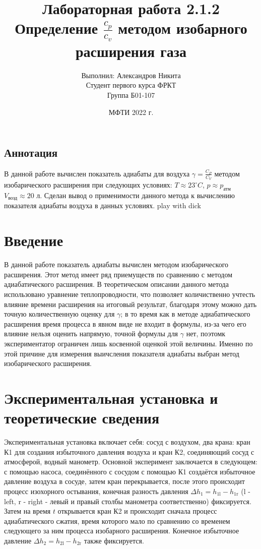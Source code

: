 \documentclass[a4paper,14pt]{article}
\title{Лабораторная работа 2.1.2\\Определение $\frac{c_p}{c_v}$ методом
изобарного расширения газа}
\author{Выполнил: Александров Никита\\ Студент первого курса ФРКТ\\Группа Б01-107}
\date{МФТИ 2022 г.}
\begin{document}
\maketitle
\newpage
\begin{center}
\tableofcontents
\end{center}
\newpage

\begin{center}
\section*{Аннотация}
\end{center}

В данной работе вычислен показатель адиабаты для воздуха $\gamma = \frac{C_P}{C_V}$ методом изобарического расширения при следующих условиях: $T \approx 23^{\circ}C$, $p \approx p_\text{атм}$ $V_\text{возд} \approx 20$ л. Сделан вывод о применимости данного метода к вычислению показателя адиабаты воздуха в данных условиях. play with dick


\section{Введение}

В данной работе показатель адиабаты вычислен методом изобарического расширения. Этот метод имеет ряд приемуществ по сравнению с методом адиабатического расширения. В теоретическом описании данного метода использовано уравнение теплопроводности, что позволяет количиственно учтесть влияние времени расширения на итоговый результат, благодаря этому можно дать точную количественную оценку для $\gamma$; в то время как в методе адиабатического расширения время процесса в явном виде не входит в формулы, из-за чего его влияние нельзя оценить напрямую, точной формулы для $\gamma$ нет, поэтомк экспериментатор ограничен лишь косвенной оценкой этой величины. Именно по этой причине для измерения выичсления показателя адиабаты выбран метод изобарического расширения.

\section{Экспериментальная установка и теоретические сведения}

Экспериментальная установка включает себя: сосуд с воздухом, два крана: кран К1 для создания избыточного давления воздуха и кран К2, соединяющий сосуд с атмосферой, водный манометр. Основной эксперимент заключается в следующем: с помощью насоса, соединённого с сосудом с помощью К1 создаётся избыточное давление воздуха в сосуде, затем кран перекрывается, после этого происходит процесс изохорного остывания, конечная разность давления $\Delta h_1 = h_{1\text{l}} - h_{1\text{r}}$ (l - left, r - right - левый и правый столбы манометра соответственно) фиксируется. Затем на время $t$ открывается кран К2 и происходит сначала процесс адиабатического сжатия, время которого мало по сравнению со временем следующего за ним процесса изобарного расширения. Конечное избыточное давление 
$\Delta h_2 = h_{2\text{l}} - h_{2\text{r}}$ также фиксируется.
\end{document}
